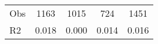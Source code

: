 \begin{tabular}{l*{4}{c}}
\hline                                                                                                                                                                                                                                            
 Obs                   &               1163               &       1015                       &       724                &              1451                                               \\ 
 R2                    &                      0.018              &              0.000                      &              0.014               &                     0.016                                              \\ 
\hline \end{tabular}                                                                                                                                                                                                              